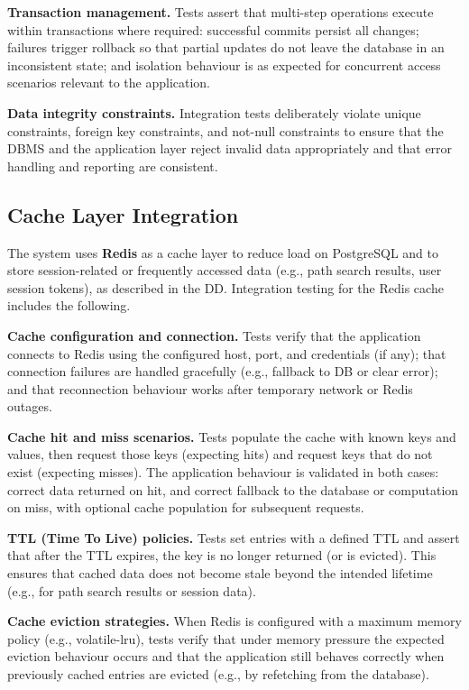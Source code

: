 \textbf{Transaction management.} Tests assert that multi-step operations execute within transactions where required: successful commits persist all changes; failures trigger rollback so that partial updates do not leave the database in an inconsistent state; and isolation behaviour is as expected for concurrent access scenarios relevant to the application.

\textbf{Data integrity constraints.} Integration tests deliberately violate unique constraints, foreign key constraints, and not-null constraints to ensure that the DBMS and the application layer reject invalid data appropriately and that error handling and reporting are consistent.

\subsection{Cache Layer Integration}
\label{subsec:cache_layer_integration}%

The system uses \textbf{Redis} as a cache layer to reduce load on PostgreSQL and to store session-related or frequently accessed data (e.g., path search results, user session tokens), as described in the DD. Integration testing for the Redis cache includes the following.

\textbf{Cache configuration and connection.} Tests verify that the application connects to Redis using the configured host, port, and credentials (if any); that connection failures are handled gracefully (e.g., fallback to DB or clear error); and that reconnection behaviour works after temporary network or Redis outages.

\textbf{Cache hit and miss scenarios.} Tests populate the cache with known keys and values, then request those keys (expecting hits) and request keys that do not exist (expecting misses). The application behaviour is validated in both cases: correct data returned on hit, and correct fallback to the database or computation on miss, with optional cache population for subsequent requests.

\textbf{TTL (Time To Live) policies.} Tests set entries with a defined TTL and assert that after the TTL expires, the key is no longer returned (or is evicted). This ensures that cached data does not become stale beyond the intended lifetime (e.g., for path search results or session data).

\textbf{Cache eviction strategies.} When Redis is configured with a maximum memory policy (e.g., volatile-lru), tests verify that under memory pressure the expected eviction behaviour occurs and that the application still behaves correctly when previously cached entries are evicted (e.g., by refetching from the database).

